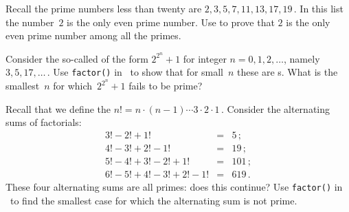 \begin{draft}
\begin{exercise} \label{ex:} 
Recall the prime numbers less than twenty are \(2,3,5,7,11,13,17,19\)\,.
In this list the number~\(2\) is the only even prime number.
Use  to prove that \(2\) is the only even prime number among all the primes.
\end{exercise}



\begin{exercise} \label{ex:} 
Consider the so-called  of the form \(2^{2^n}+1\) for integer \(n=0,1,2,\ldots\), namely \(3,5,17,\ldots\)\,.  
Use \verb|factor()| in \script\ to show that for small~\(n\) these are s.
What is the smallest~\(n\) for which~\(2^{2^n}+1\) fails to be prime?
\end{exercise}


\begin{exercise} \label{ex:} 
Recall that we define the  \(n!=n\cdot(n-1)\cdots3\cdot2\cdot1\)\,.
Consider the alternating sums of factorials:
\begin{eqnarray*}
3!-2!+1!&=&5\,;\\
4!-3!+2!-1!&=&19\,;\\
5!-4!+3!-2!+1!&=&101\,;\\
6!-5!+4!-3!+2!-1!&=&619\,.
\end{eqnarray*}
These four alternating sums are all primes: does this continue?
Use \verb|factor()| in \script\ to find the smallest case for which the alternating sum is not prime.
\end{exercise}



\end{draft}
